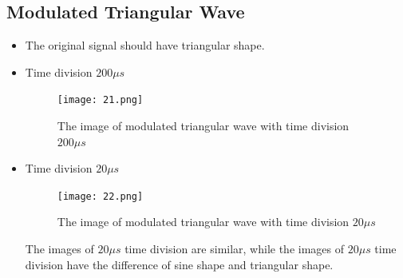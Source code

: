 \documentclass[utf8]{article}
\begin{document}
\subsection{Modulated Triangular Wave}
\begin{itemize}
\item The original signal should have triangular shape.
\item Time division $200\mu s$ 
\begin{figure}[htbp]
	\centering
		\texttt{[image: 21.png]}
	\caption{The image of modulated triangular wave with time division $200\mu s$}
	\label{fig-2-1}
\end{figure}

\item Time division $20\mu s$ 
\begin{figure}[htbp]
	\centering
		\texttt{[image: 22.png]}
	\caption{The image of modulated triangular wave with time division $20\mu s$}	
	\label{fig-2-2}
\end{figure}
The images of $20\mu s$ time division are similar, while the images of $20\mu s$ time division have the difference of sine shape and triangular shape.
\end{itemize}
\end{document}
